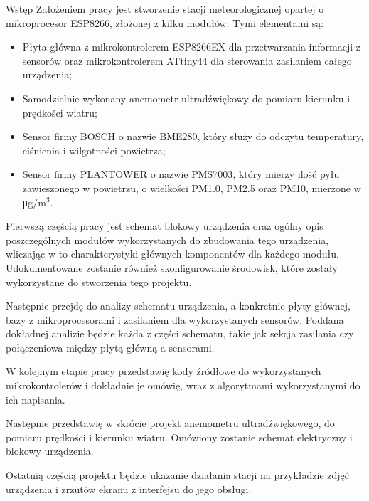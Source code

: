 \documentclass[12pt,a4paper]{scrartcl}
\begin{document}
\begin{section}	{\fontsize{14pt}{16.8pt} \tytulyrozdzialow Wstęp}
	\hspace{\parindent} Założeniem pracy jest stworzenie stacji meteorologicznej opartej o mikroprocesor ESP8266, złożonej z kilku modułów. Tymi elementami są:
	\begin{itemize}{}{}
		\item Płyta główna z mikrokontrolerem ESP8266EX dla przetwarzania informacji z sensorów oraz mikrokontrolerem ATtiny44 dla sterowania zasilaniem całego urządzenia;
		\item Samodzielnie wykonany anemometr ultradźwiękowy do pomiaru kierunku i prędkości wiatru;
		\item Sensor firmy BOSCH o nazwie BME280, który służy do odczytu temperatury, ciśnienia i wilgotności powietrza;
		\item Sensor firmy PLANTOWER o nazwie PMS7003, który mierzy ilość pyłu zawieszonego w powietrzu, o wielkości PM1.0, PM2.5 oraz PM10, mierzone w \si\micro g/m$^{3}$.
	\end{itemize}
	\par Pierwszą częścią pracy jest schemat blokowy urządzenia oraz ogólny opis poszczególnych modułów wykorzystanych do zbudowania tego urządzenia, wliczając w to charakterystyki głównych komponentów dla każdego modułu. Udokumentowane zostanie również skonfigurowanie środowisk, które zostały wykorzystane do stworzenia tego projektu.
	\par Następnie przejdę do analizy schematu urządzenia, a konkretnie płyty głównej, bazy z mikroprocesorami i zasilaniem dla wykorzystanych sensorów. Poddana dokładnej analizie będzie każda z części schematu, takie jak sekcja zasilania czy połączeniowa między płytą główną a sensorami.
	\par W kolejnym etapie pracy przedstawię kody źródłowe do wykorzystanych mikrokontrolerów i dokładnie je omówię, wraz z algorytmami wykorzystanymi do ich napisania.
	\par Następnie przedstawię w skrócie projekt anemometru ultradźwiękowego, do pomiaru prędkości i kierunku wiatru. Omówiony zostanie schemat elektryczny i blokowy urządzenia.
	\par Ostatnią częścią projektu będzie ukazanie działania stacji na przykładzie zdjęć urządzenia i zrzutów ekranu z interfejsu do jego obsługi.
\end{section}
\end{document}
